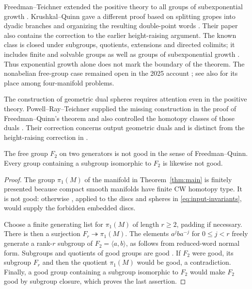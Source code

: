 Freedman--Teichner extended the positive theory to all groups of
subexponential growth \cite[Theorem~0.1]{FT1995}. Krushkal--Quinn gave
a different proof based on splitting gropes into dyadic branches and
organizing the resulting double-point words \cite[p.~408]{KQ2000}.
Their paper also contains the correction to the earlier height-raising
argument. The known class is closed under subgroups, quotients,
extensions and directed colimits; it includes finite and solvable groups as
well as groups of subexponential growth
\cite[Section~1.1]{PRT2025}. Thus exponential growth alone does not
mark the boundary of the theorem. The nonabelian free-group case
remained open in the 2025 account \cite{PRT2025}; see also
\cite[Chapter~23]{KOPR2021} for its place among four-manifold problems.

The construction of geometric dual spheres requires attention even
in the positive theory. Powell--Ray--Teichner supplied the missing
construction in the proof of Freedman--Quinn's theorem and also
controlled the homotopy classes of those duals
\cite[Theorem~A and Remark~1.3]{PRT2025}. Their correction concerns
output geometric duals and is distinct from the height-raising
correction in \cite{KQ2000}.

\begin{corollary}\label{cor:nongood}
The free group $F_2$ on two generators is not good in the sense of
Freedman--Quinn. Every group containing a subgroup isomorphic to $F_2$
is likewise not good.
\end{corollary}
\begin{proof}
The group $\pi_1(M)$ of the manifold in Theorem~\ref{thm:main} is
finitely presented because compact smooth manifolds have finite CW
homotopy type. It is not good: otherwise \cite[Theorem~A]{PRT2025},
applied to the discs and spheres in \eqref{eq:input-invariants}, would
supply the forbidden embedded discs.

Choose a finite generating list for $\pi_1(M)$ of length $r\geq2$,
padding if necessary. There is then a surjection
$F_r\twoheadrightarrow\pi_1(M)$. The elements $a^jba^{-j}$ for
$0\leq j<r$ freely generate a rank-$r$ subgroup of
$F_2=\langle a,b\rangle$, as follows from reduced-word normal form.
Subgroups and quotients of good groups are good
\cite[Section~1.1, p.~4]{PRT2025}. If $F_2$ were good, its subgroup
$F_r$ and then the quotient $\pi_1(M)$ would be good, a contradiction.
Finally, a good group containing a subgroup isomorphic to $F_2$ would
make $F_2$ good by subgroup closure, which proves the last assertion.
\end{proof}

